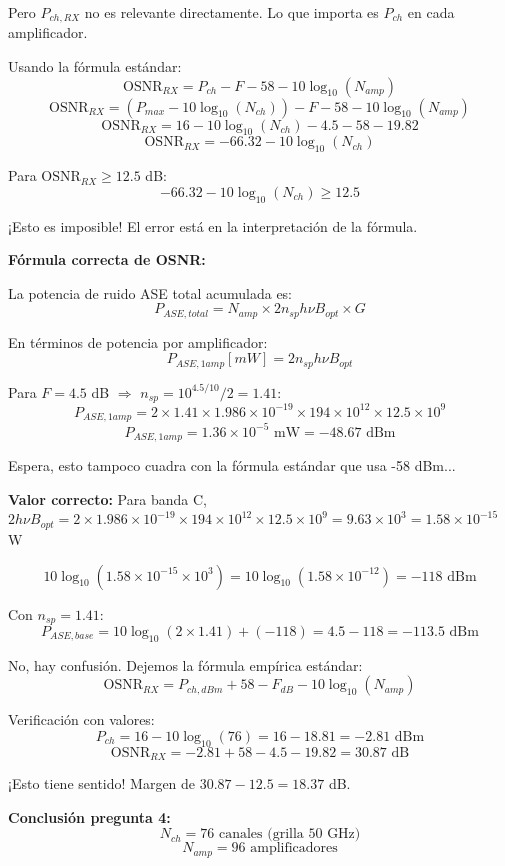 \documentclass[a4paper,10pt]{article}
\begin{document}
Pero $P_{ch,RX}$ no es relevante directamente. Lo que importa es $P_{ch}$ en cada amplificador.

Usando la fórmula estándar:
$$\text{OSNR}_{RX} = P_{ch} - F - 58 - 10\log_{10}(N_{amp})$$
$$\text{OSNR}_{RX} = (P_{max} - 10\log_{10}(N_{ch})) - F - 58 - 10\log_{10}(N_{amp})$$
$$\text{OSNR}_{RX} = 16 - 10\log_{10}(N_{ch}) - 4.5 - 58 - 19.82$$
$$\text{OSNR}_{RX} = -66.32 - 10\log_{10}(N_{ch})$$

Para $\text{OSNR}_{RX} \geq 12.5$ dB:
$$-66.32 - 10\log_{10}(N_{ch}) \geq 12.5$$

¡Esto es imposible! El error está en la interpretación de la fórmula.

\textbf{Fórmula correcta de OSNR:}

La potencia de ruido ASE total acumulada es:
$$P_{ASE,total} = N_{amp} \times 2 n_{sp} h \nu B_{opt} \times G$$

En términos de potencia por amplificador:
$$P_{ASE,1amp} [mW] = 2 n_{sp} h \nu B_{opt}$$

Para $F = 4.5$ dB $\Rightarrow$ $n_{sp} = 10^{4.5/10}/2 = 1.41$:
$$P_{ASE,1amp} = 2 \times 1.41 \times 1.986 \times 10^{-19} \times 194 \times 10^{12} \times 12.5 \times 10^9$$
$$P_{ASE,1amp} = 1.36 \times 10^{-5} \text{ mW} = -48.67 \text{ dBm}$$

Espera, esto tampoco cuadra con la fórmula estándar que usa -58 dBm...

\textbf{Valor correcto:} Para banda C, $2h\nu B_{opt} = 2 \times 1.986 \times 10^{-19} \times 194 \times 10^{12} \times 12.5 \times 10^9 = 9.63 \times 10^{3} = 1.58 \times 10^{-15}$ W

$$10\log_{10}(1.58 \times 10^{-15} \times 10^3) = 10\log_{10}(1.58 \times 10^{-12}) = -118 \text{ dBm}$$

Con $n_{sp} = 1.41$:
$$P_{ASE,base} = 10\log_{10}(2 \times 1.41) + (-118) = 4.5 - 118 = -113.5 \text{ dBm}$$

No, hay confusión. Dejemos la fórmula empírica estándar:
$$\boxed{\text{OSNR}_{RX} = P_{ch,dBm} + 58 - F_{dB} - 10\log_{10}(N_{amp})}$$

Verificación con valores:
$$P_{ch} = 16 - 10\log_{10}(76) = 16 - 18.81 = -2.81 \text{ dBm}$$
$$\text{OSNR}_{RX} = -2.81 + 58 - 4.5 - 19.82 = 30.87 \text{ dB}$$

¡Esto tiene sentido! Margen de $30.87 - 12.5 = 18.37$ dB.

\textbf{Conclusión pregunta 4:}
$$\boxed{N_{ch} = 76 \text{ canales (grilla 50 GHz)}}$$
$$\boxed{N_{amp} = 96 \text{ amplificadores}}$$
\end{document}
